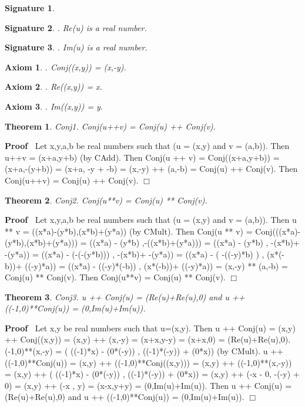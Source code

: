 \documentclass{article}
\newenvironment{forthel}{\begin{leftbar}}{\end{leftbar}}
\newenvironment{proof}{\noindent\textbf{Proof\ }}{\hspace*{\fill}$\Box$\medskip}
\newtheorem{axiom}{Axiom}
\newtheorem{theorem}{Theorem}
\newtheorem{signature}{Signature}
\begin{document}
\begin{forthel}
\begin{signature}
\end{signature}
\begin{signature}. Re(u) is a real number.

\end{signature}
\begin{signature}. Im(u) is a real number.

\end{signature}
\begin{axiom}. Conj((x,y)) = (x,-y).

\end{axiom}
\begin{axiom}. Re((x,y)) = x.

\end{axiom}
\begin{axiom}. Im((x,y)) = y.

\end{axiom}

\begin{theorem}
 Conj1. Conj(u++v) = Conj(u) ++ Conj(v).
\end{theorem}\begin{proof}
 	Let x,y,a,b be real numbers such that (u = (x,y) and v = (a,b)).
Then u++v = (x+a,y+b) (by CAdd).
Then Conj(u ++ v) = Conj((x+a,y+b)) = (x+a,-(y+b)) = (x+a, -y + -b) = (x,-y) ++ (a,-b) = Conj(u) ++ Conj(v).
Then Conj(u++v) = Conj(u) ++ Conj(v).
\end{proof}
		
\begin{theorem}
 Conj2. Conj(u**v) = Conj(u) ** Conj(v).
\end{theorem}\begin{proof}
 	Let x,y,a,b be real numbers such that (u = (x,y) and v = (a,b)).
Then u ** v = ((x*a)-(y*b),(x*b)+(y*a)) (by CMult).
Then Conj(u ** v) 	= Conj(((x*a)-(y*b),(x*b)+(y*a))) 
= ((x*a) - (y*b)       ,-((x*b)+(y*a))) 
= ((x*a) - (y*b)       , -(x*b)+ -(y*a))
= ((x*a) - (-(-(y*b))) , -(x*b)+ -(y*a))
= ((x*a) - ( -((-y)*b) ) , (x*(-b))+ ((-y)*a))
= ((x*a) - ((-y)*(-b)) , (x*(-b))+ ((-y)*a))
= (x,-y) ** (a,-b)
= Conj(u) ** Conj(v). 
Then Conj(u**v) = Conj(u) ** Conj(v).
\end{proof}


\begin{theorem}
 Conj3. u ++ Conj(u) = (Re(u)+Re(u),0) and u ++ ((-1,0)**Conj(u)) = (0,Im(u)+Im(u)).
\end{theorem}\begin{proof}
 Let x,y be real numbers such that u=(x,y).
Then u ++ Conj(u) = (x,y) ++ Conj((x,y)) = (x,y) ++ (x,-y) = (x+x,y-y) = (x+x,0) = (Re(u)+Re(u),0).
(-1,0)**(x,-y) = ( ((-1)*x) - (0*(-y)) , ((-1)*(-y)) + (0*x)) (by CMult).
u ++ ((-1,0)**Conj(u))	= (x,y) ++ ((-1,0)**Conj((x,y))) = (x,y) ++ ((-1,0)**(x,-y)) 
= (x,y) ++ ( ((-1)*x) - (0*(-y)) , ((-1)*(-y)) + (0*x))
= (x,y) ++ (-x - 0, -(-y) + 0)
= (x,y) ++ (-x , y) = (x-x,y+y) = (0,Im(u)+Im(u)).
Then u ++ Conj(u) = (Re(u)+Re(u),0) and u ++ ((-1,0)**Conj(u)) = (0,Im(u)+Im(u)).
\end{proof}
	   


\end{forthel}
\end{document}
